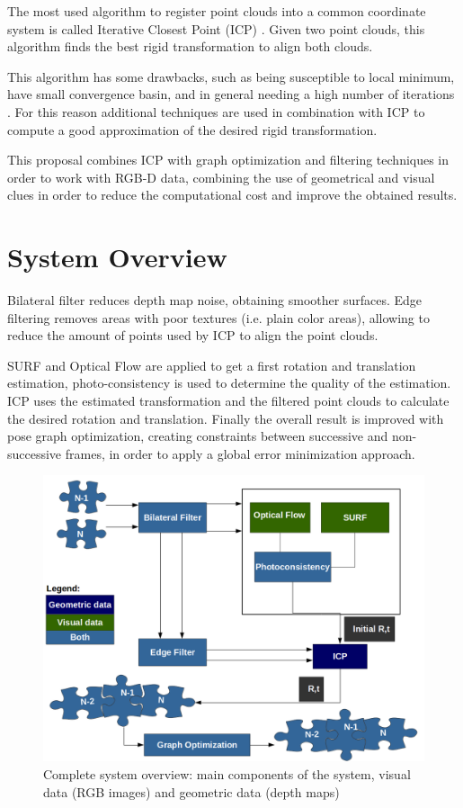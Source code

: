 
The most used algorithm to register point clouds into a common coordinate 
system is called Iterative Closest Point (ICP) \cite{mckay92}. Given two point clouds, 
this algorithm finds the best rigid transformation to align both clouds. 

This algorithm has some drawbacks, such as being susceptible to local minimum, 
have small convergence basin, and in general needing a high number of iterations \cite{Rusu2009}. 
For this reason additional techniques are used in combination with ICP to compute a good approximation 
of the desired rigid transformation.  


This proposal combines ICP with graph optimization and filtering techniques in order to work with RGB-D data, combining the use of geometrical 
and visual clues in order to reduce the computational cost and improve the obtained results.

\section{System Overview}

Bilateral filter reduces depth map noise, obtaining smoother surfaces. Edge filtering removes areas with poor textures (i.e. plain color areas), 
allowing to reduce the amount of points used by ICP to align the point clouds. 

SURF and Optical Flow are applied to get a first rotation and translation estimation, photo-consistency is used to determine the quality of the estimation. ICP uses the estimated transformation and the filtered 
point clouds to calculate the desired rotation and translation. Finally the overall result is improved with pose graph optimization, creating constraints between successive and non-successive frames, in order to apply a global error minimization approach.

\begin{figure}[H]
\begin{center}
\includegraphics[scale=0.45]{images/complete_system}
\caption{Complete system overview: main components of the system, visual data (RGB images) and geometric data (depth maps)}
\end{center}
\end{figure}

